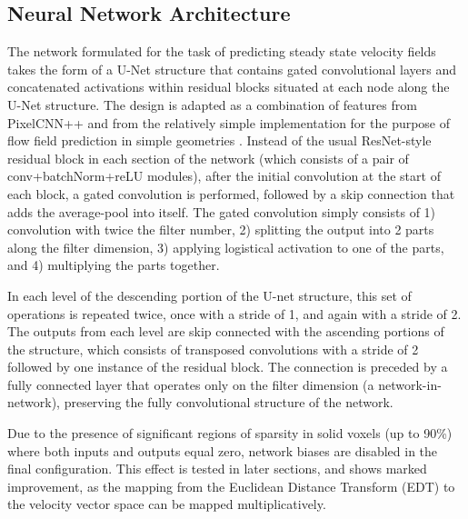 \documentclass{article}
\begin{document}
\subsection{Neural Network Architecture}
\label{sec:neuralnetworkarchitecture}

The network formulated for the task of predicting steady state velocity fields takes the form of a U-Net structure \cite{ronneberger2015unet} that contains gated convolutional layers and concatenated activations within residual blocks situated at each node along the U-Net structure. The design is adapted as a combination of features from PixelCNN++ \cite{salimans2017pixelcnn} and from the relatively simple implementation for the purpose of flow field prediction in simple geometries \cite{autodeskflow}. Instead of the usual ResNet-style residual block in each section of the network (which consists of a pair of conv+batchNorm+reLU modules), after the initial convolution at the start of each block, a gated convolution is performed, followed by a skip connection that adds the average-pool into itself. The gated convolution simply consists of 1) convolution with twice the filter number, 2) splitting the output into 2 parts along the filter dimension, 3) applying logistical activation to one of the parts, and 4) multiplying the parts together. 

In each level of the descending portion of the U-net structure, this set of operations is repeated twice, once with a stride of 1, and again with a stride of 2. The outputs from each level are skip connected with the ascending portions of the structure, which consists of transposed convolutions with a stride of 2 followed by one instance of the residual block. The connection is preceded by a fully connected layer that operates only on the filter dimension (a network-in-network), preserving the fully convolutional structure of the network.

Due to the presence of significant regions of sparsity in solid voxels (up to 90\%) where both inputs and outputs equal zero, network biases are disabled in the final configuration. This effect is tested in later sections, and shows marked improvement, as the mapping from the Euclidean Distance Transform (EDT) to the velocity vector space can be mapped multiplicatively.
\end{document}

